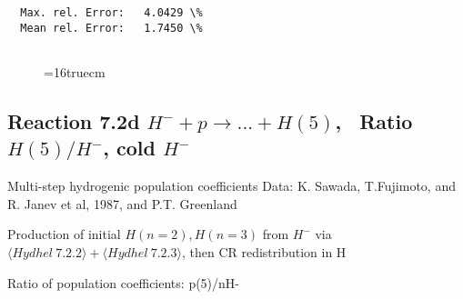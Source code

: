 \documentclass[12pt,dvipdfmx]{article}
\begin{document}
\begin{small}
\begin{verbatim}
  Max. rel. Error:   4.0429 \%
  Mean rel. Error:   1.7450 \%


\end{verbatim}\end{small}
\begin{figure} \label{7.2c}
\epsfxsize=16truecm
\end{figure}
\newpage

\subsection{
Reaction 7.2d $ H^- + p \rightarrow ...+ H(5) $, \   Ratio $H(5)/H^- $, cold $H^-$
}
 Multi-step hydrogenic population coefficients
 Data: K. Sawada, T.Fujimoto, \cite{kn:Sawada} and R. Janev et al, 1987, and P.T. Greenland

Production of initial $H(n=2), H(n=3)$ from $H^-$ via $ \langle Hydhel~ 7.2.2\rangle + \langle Hydhel~ 7.2.3\rangle$,
 then CR redistribution in H

 Ratio of population coefficients: p(5)/nH-
\end{document}
